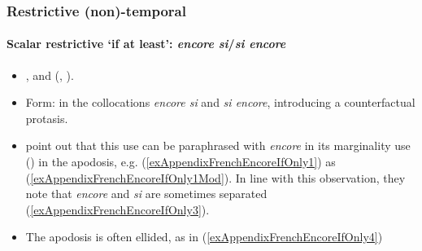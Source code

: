 \subsubsection{Restrictive (non)-temporal}
\paragraph{Scalar restrictive \lq if at least': \textit{encore si}/\textit{si encore}}
\label{appendixFrenchEncoreIfOnly}
\begin{itemize}
	\item \textcite[s.v. \textit{encore}]{Dicctionnaire}, \textcite{Deloor2012} and \citeauthor{VictorriFuchs1992} (\citeyear{VictorriFuchs1992}, \citeyear{VictorriFuchs1996}).
	\item Form: in the collocations \textit{encore si} and \textit{si encore}, introducing a counterfactual protasis.
	\item  \textcite[83–84]{VictorriFuchs1996} point out that this use can be paraphrased with \textit{encore} in its marginality use  () in the apodosis, e.g. (\ref{exAppendixFrenchEncoreIfOnly1}) as (\ref{exAppendixFrenchEncoreIfOnly1Mod}). In line with this observation, they note that \textit{encore} and \textit{si} are sometimes separated (\ref{exAppendixFrenchEncoreIfOnly3}).
	\item The apodosis is often ellided, as in (\ref{exAppendixFrenchEncoreIfOnly4})
\end{itemize}
